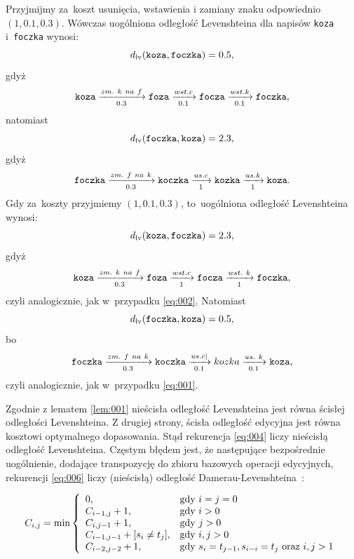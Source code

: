 \documentclass{praca1}
\begin{document}
\begin{example}
Przyjmijmy za~koszt usunięcia, wstawienia i zamiany znaku odpowiednio $(1, 0.1, 0.3)$. Wówczas uogólniona odległość Levenshteina dla napisów \verb|koza| i~\verb|foczka| wynosi:
\begin{equation}
\label{eq:001}
d_{\mathrm{lv}}(\verb|koza|, \verb|foczka|) = 0.5,
\end{equation}
gdyż
$$
\verb|koza|  \xrightarrow[0.3]{zm.\ k\ na\ f} \verb|foza|  \xrightarrow[0.1]{wst. c} \verb|focza| \xrightarrow[0.1]{wst. k} \verb|foczka|,
$$
natomiast
\begin{equation}\label{eq:002}
d_{\mathrm{lv}}(\verb|foczka|, \verb|koza|) = 2.3,
\end{equation}
gdyż
$$
\verb|foczka|  \xrightarrow[0.3]{zm.\ f\ na\ k} \verb|koczka|  \xrightarrow[1]{us. c} \verb|kozka| \xrightarrow[1]{us. k} \verb|koza|.
$$
Gdy za~koszty przyjmiemy $(1, 0.1, 0.3)$, to~uogólniona odległość Levenshteina wynosi:
$$
d_{\mathrm{lv}}(\verb|koza|, \verb|foczka|) = 2.3,
$$
gdyż
$$
\verb|koza|  \xrightarrow[0.3]{zm.\ k\ na\ f} \verb|foza|  \xrightarrow[1]{wst. c} \verb|focza| \xrightarrow[1]{wst.\ k} \verb|foczka|,
$$
czyli analogicznie, jak w~przypadku \ref{eq:002}. Natomiast
$$
d_{\mathrm{lv}}(\verb|foczka|, \verb|koza|) = 0.5,
$$
bo
$$
\verb|foczka|  \xrightarrow[0.3]{zm.\ f\ na\ k} \verb|koczka|  \xrightarrow[0.1]{us. c|} kozka \xrightarrow[0.1]{us.\ k} \verb|koza|,
$$
czyli analogicznie, jak w~przypadku \ref{eq:001}.
\end{example}

Zgodnie z lematem \ref{lem:001} nieścisła odległość Levenshteina jest równa ścisłej odległości Levenshteina. Z drugiej strony, ścisła odległość edycyjna jest równa kosztowi optymalnego dopasowania. Stąd rekurencja \ref{eq:004} liczy nieścisłą odległość Levenshteina. Częstym błędem jest, że następujące bezpośrednie uogólnienie, dodające transpozycję do zbioru bazowych operacji edycyjnych, rekurencji \ref{eq:006} liczy (nieścisłą) odległość Damerau-Levenshteina~\cite{Boytsov2011:indexingmethods}:

\begin{equation}
\label{eq:007}
C_{i,j} = \min\left\{
\begin{array}{l l}     
    0, & \text{gdy } i = j = 0\\
    C_{i-1, j} + 1, & \text{gdy } i > 0 \\
    C_{i, j-1} + 1, & \text{gdy } j > 0 \\
    C_{i-1, j-1} + [s_{i}\neq t_{j}], & \text{gdy } i, j > 0 \\
    C_{i-2, j-2} + 1, & \text{gdy } s_i = t_{j-1}, s_{i-i} = t_j \text{ oraz } i,j > 1
\end{array}\right.
\end{equation}
\end{document}

